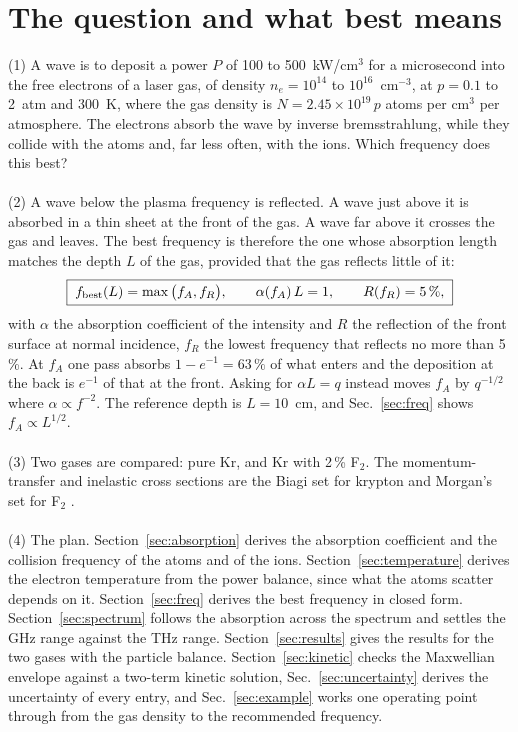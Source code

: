\documentclass[11pt]{article}
\numberwithin{equation}{section}
\newcommand{\fbest}{f_{\rm best}}
\begin{document}
\section{The question and what best means}
\label{sec:question}
{\noindent}(1) A wave is to deposit a power $P$ of 100 to 500~kW/cm$^3$ for a microsecond
into the free electrons of a laser gas, of density $n_e=10^{14}$ to $10^{16}$~cm$^{-3}$,
at $p=0.1$ to 2~atm and 300~K, where the gas density is $N=2.45\times10^{19}\,p$
atoms per cm$^3$ per atmosphere. The electrons absorb the wave by inverse
bremsstrahlung, while they collide with the atoms and, far less often, with the ions.
Which frequency does this best?
\\ \\
{\noindent}(2) A wave below the plasma frequency is reflected. A wave just above it is
absorbed in a thin sheet at the front of the gas. A wave far above it crosses the gas and
leaves. The best frequency is therefore the one whose absorption length matches the
depth $L$ of the gas, provided that the gas reflects little of it:
\begin{equation}
\boxed{\;\fbest(L)=\max\big(f_A,f_R\big),\qquad \alpha(f_A)\,L=1,\qquad R(f_R)=5\,\%,\;}
\label{eq:fbest}
\end{equation}
with $\alpha$ the absorption coefficient of the intensity and $R$ the reflection of the
front surface at normal incidence, $f_R$ the lowest frequency that reflects no more than
5\,\%. At $f_A$ one pass absorbs $1-e^{-1}=63\,\%$ of what enters and the deposition at
the back is $e^{-1}$ of that at the front. Asking for $\alpha L=q$ instead moves $f_A$ by
$q^{-1/2}$ where $\alpha\propto f^{-2}$. The reference depth is $L=10$~cm, and
Sec.~\ref{sec:freq} shows $f_A\propto L^{1/2}$.
\\ \\
{\noindent}(3) Two gases are compared: pure Kr, and Kr with 2\,\% F$_2$. The
momentum-transfer and inelastic cross sections are the Biagi set for krypton
\cite{Pitchford2016} and Morgan's set for F$_2$ \cite{Morgan1992}.
\\ \\
{\noindent}(4) The plan. Section~\ref{sec:absorption} derives the absorption coefficient
and the collision frequency of the atoms and of the ions. Section~\ref{sec:temperature}
derives the electron temperature from the power balance, since what the atoms scatter
depends on it. Section~\ref{sec:freq} derives the best frequency in closed form.
Section~\ref{sec:spectrum} follows the absorption across the spectrum and settles the GHz
range against the THz range. Section~\ref{sec:results} gives the results for the two gases
with the particle balance. Section~\ref{sec:kinetic} checks the Maxwellian envelope against
a two-term kinetic solution, Sec.~\ref{sec:uncertainty} derives the uncertainty of every
entry, and Sec.~\ref{sec:example} works one operating point through from the gas density to
the recommended frequency.
\end{document}
